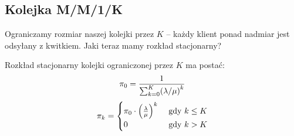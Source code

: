 \subsection{Kolejka M/M/1/K}
Ograniczamy rozmiar naszej kolejki przez \( K \) -- każdy klient ponad nadmiar jest odsyłany z kwitkiem.
Jaki teraz mamy rozkład stacjonarny?

\begin{theorem}[strona 233 P\&C]
    Rozkład stacjonarny kolejki ograniczonej przez \( K \) ma postać:
    \[
        \pi_0 = \frac{1}{\sum_{k=0}^K \pars{\lambda/\mu}^k}
    \]
    \[
        \pi_k = \begin{cases}
            \pi_0 \cdot \left(\frac{\lambda}{\mu}\right)^k & \text{ gdy } k \leq K \\
            0 & \text{ gdy } k > K
        \end{cases}
    \]
    
\end{theorem}
  
